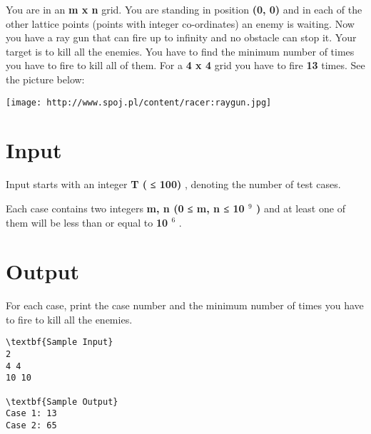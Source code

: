 

You are in an \textbf{ m x n } grid. You are standing in position \textbf{ (0, 0) } and in each of the other lattice points (points with integer co-ordinates) an enemy is waiting. Now you have a ray gun that can fire up to infinity and no obstacle can stop it. Your target is to kill all the enemies. You have to find the minimum number of times you have to fire to kill all of them. For a \textbf{ 4 x 4 } grid you have to fire \textbf{ 13 } times. See the picture below:


\texttt{[image: http://www.spoj.pl/content/racer:raygun.jpg]}

\section{Input}

Input starts with an integer \textbf{ T ( }\textbf{ ≤ 100) } , denoting the number of test cases.

Each case contains two integers \textbf{ m, n (0 ≤ m, n ≤ 10 $^ 9 $ ) } and at least one of them will be less than or equal to \textbf{ 10 $^ 6 $} .

\section{Output}

For each case, print the case number and the minimum number of times you have to fire to kill all the enemies.
\begin{verbatim}
\textbf{Sample Input}
2
4 4
10 10

\textbf{Sample Output}
Case 1: 13
Case 2: 65\end{verbatim}

 